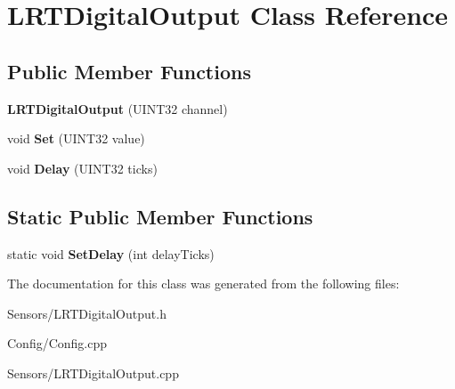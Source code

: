 \hypertarget{class_l_r_t_digital_output}{
\section{\-L\-R\-T\-Digital\-Output \-Class \-Reference}
\label{class_l_r_t_digital_output}
}
\subsection*{\-Public \-Member \-Functions}
\begin{DoxyCompactItemize}
\item 
\hypertarget{class_l_r_t_digital_output_a700092fc80c6674cfbf235e919699b70}{
{\bfseries \-L\-R\-T\-Digital\-Output} (\-U\-I\-N\-T32 channel)}
\label{class_l_r_t_digital_output_a700092fc80c6674cfbf235e919699b70}

\item 
\hypertarget{class_l_r_t_digital_output_ac939317cca4e5891068a8f479834b41d}{
void {\bfseries \-Set} (\-U\-I\-N\-T32 value)}
\label{class_l_r_t_digital_output_ac939317cca4e5891068a8f479834b41d}

\item 
\hypertarget{class_l_r_t_digital_output_af3854945298c9daaaa5c79bfb965d54e}{
void {\bfseries \-Delay} (\-U\-I\-N\-T32 ticks)}
\label{class_l_r_t_digital_output_af3854945298c9daaaa5c79bfb965d54e}

\end{DoxyCompactItemize}
\subsection*{\-Static \-Public \-Member \-Functions}
\begin{DoxyCompactItemize}
\item 
\hypertarget{class_l_r_t_digital_output_ab027295eda900e9fab564d5edbca53f2}{
static void {\bfseries \-Set\-Delay} (int delay\-Ticks)}
\label{class_l_r_t_digital_output_ab027295eda900e9fab564d5edbca53f2}

\end{DoxyCompactItemize}


\-The documentation for this class was generated from the following files\-:\begin{DoxyCompactItemize}
\item 
\-Sensors/\-L\-R\-T\-Digital\-Output.\-h\item 
\-Config/\-Config.\-cpp\item 
\-Sensors/\-L\-R\-T\-Digital\-Output.\-cpp\end{DoxyCompactItemize}
